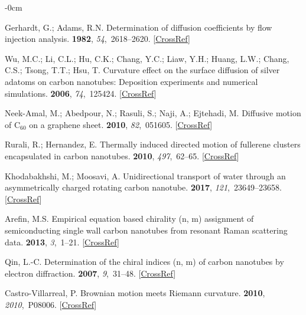 \documentclass[molecules,article,accept,pdftex,moreauthors]{Definitions/mdpi}
\begin{document}
\begin{adjustwidth}{-\extralength}{0cm}
\begin{thebibliography}{999}
Gerhardt, G.; Adams, R.N.
\newblock Determination of diffusion coefficients by flow injection analysis.
 {\bf 1982}, {\em 54},~2618--2620. [\href{http://dx.doi.org/10.1021/ac00251a054}{CrossRef}]

Wu, M.C.; Li, C.L.; Hu, C.K.; Chang, Y.C.; Liaw, Y.H.; Huang, L.W.; Chang,
C.S.; Tsong, T.T.; Hsu, T.
\newblock Curvature effect on the surface diffusion of silver adatoms on carbon
nanotubes: Deposition experiments and numerical simulations.
 {\bf 2006}, {\em 74},~125424. [\href{http://dx.doi.org/10.1103/PhysRevB.74.125424}{CrossRef}]

Neek-Amal, M.; Abedpour, N.; Rasuli, S.; Naji, A.; Ejtehadi, M.
\newblock Diffusive motion of C$_{60}$ on a graphene sheet.
 {\bf 2010}, {\em 82},~051605. [\href{http://dx.doi.org/10.1103/PhysRevE.82.051605}{CrossRef}]

Rurali, R.; Hernandez, E.
\newblock Thermally induced directed motion of fullerene clusters encapsulated
in carbon nanotubes.
 {\bf 2010}, {\em 497},~62--65. [\href{http://dx.doi.org/10.1016/j.cplett.2010.07.081}{CrossRef}]

Khodabakhshi, M.; Moosavi, A.
\newblock Unidirectional transport of water through an asymmetrically charged
rotating carbon nanotube.
 {\bf 2017}, {\em
121},~23649--23658. [\href{http://dx.doi.org/10.1021/acs.jpcc.7b06003}{CrossRef}]

Arefin, M.S.
\newblock Empirical equation based chirality (n, m) assignment of semiconducting single wall carbon nanotubes from resonant Raman scattering data.
 {\bf 2013}, {\em
3},~1--21. [\href{http://dx.doi.org/10.3390/nano3010001}{CrossRef}]

Qin, L.-C.
\newblock Determination of the chiral indices (n, m) of carbon nanotubes by electron diffraction.
 {\bf 2007}, {\em
9},~31--48. [\href{http://dx.doi.org/10.1039/B614121H}{CrossRef}]

Castro-Villarreal, P.
\newblock Brownian motion meets Riemann curvature.
 {\bf 2010}, {\em
2010},~P08006. [\href{http://dx.doi.org/10.1088/1742-5468/2010/08/P08006}{CrossRef}]


\end{thebibliography}
\end{adjustwidth}
\end{document}
